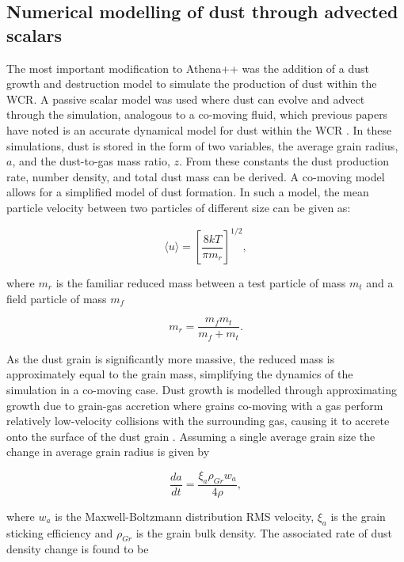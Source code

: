 \subsection{Numerical modelling of dust through advected scalars}

The most important modification to Athena++ was the addition of a dust growth and destruction model to simulate the production of dust within the WCR.
A passive scalar model was used where dust can evolve and advect through the simulation, analogous to a co-moving fluid, which previous papers have noted is an accurate dynamical model for dust within the WCR \parencite{hendrix_pinwheels_2016}.
In these simulations, dust is stored in the form of two variables, the average grain radius, $a$, and the dust-to-gas mass ratio, $z$.
From these constants the dust production rate, number density, and total dust mass can be derived.
A co-moving model allows for a simplified model of dust formation. In such a model, the mean particle velocity between two particles of different size can be given as:

\begin{equation}
  \langle u \rangle = \left[ \frac{8kT}{\pi m_r} \right] ^{1/2} ,
\end{equation}

\noindent
where $m_r$ is the familiar reduced mass between a test particle of mass $m_t$ and a field particle of mass $m_f$

\begin{equation}
  m_r = \frac{m_f m_t}{m_f + m_t} .
\end{equation}

\noindent
As the dust grain is significantly more massive, the reduced mass is approximately equal to the grain mass, simplifying the dynamics of the simulation in a co-moving case.
Dust growth is modelled through approximating growth due to grain-gas accretion where grains co-moving with a gas perform relatively low-velocity collisions with the surrounding gas, causing it to accrete onto the surface of the dust grain \parencite{spitzer_jr._physical_2008}.
Assuming a single average grain size the change in average grain radius is given by

\begin{equation}
  \frac{da}{dt} = \frac{\xi_a \rho_{Gr} w_a}{4 \rho} ,
\end{equation}

\noindent
where $w_a$ is the Maxwell-Boltzmann distribution RMS velocity, $\xi_a$ is the grain sticking efficiency and $\rho_{Gr}$ is the grain bulk density.
The associated rate of dust density change is found to be

